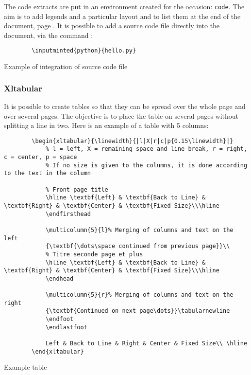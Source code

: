 The code extracts are put in an environment created for the occasion: \verb=code=.
The aim is to add legends and a particular layout and to list them at the end of the document,
page \pageref{TableOfCode}.
It is possible to add a source code file directly into the document, via the command :
\begin{code}
    \begin{verbatim}
        \inputminted{python}{hello.py}
\end{verbatim}
    \caption{Example of integration of source code file}
\end{code}

\subsubsection{Xltabular}
It is possible to create tables so that they can be spread over the whole page and over several pages.
The objective is to place the table on several pages without splitting a line in two.
Here is an example of a table with 5 columns:
\begin{code}
    \begin{verbatim}
        \begin{xltabular}{\linewidth}{|l|X|r|c|p{0.15\linewidth}|}
            % l = left, X = remaining space and line break, r = right, c = center, p = space
            % If no size is given to the columns, it is done according to the text in the column

            % Front page title
            \hline \textbf{Left} & \textbf{Back to Line} & \textbf{Right} & \textbf{Center} & \textbf{Fixed Size}\\\hline
            \endfirsthead

            \multicolumn{5}{l}% Merging of columns and text on the left
            {\textbf{\dots\space continued from previous page}}\\
            % Titre seconde page et plus
            \hline \textbf{Left} & \textbf{Back to Line} & \textbf{Right} & \textbf{Center} & \textbf{Fixed Size}\\\hline
            \endhead

            \multicolumn{5}{r}% Merging of columns and text on the right
            {\textbf{Continued on next page\dots}}\tabularnewline
            \endfoot
            \endlastfoot

            Left & Back to Line & Right & Center & Fixed Size\\ \hline
        \end{xltabular}
\end{verbatim}
    \caption{Example table}
\end{code}

